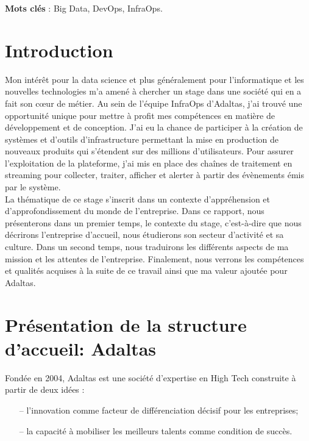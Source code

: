 \documentclass[12pt, french]{report}
\begin{document}
\noindent\textbf{Mots clés} : Big Data, DevOps, InfraOps.

\newpage
\thispagestyle{empty}
\mbox{}
\newpage

\begingroup
\hypersetup{linkcolor=black}
\listoffigures
\tableofcontents
\newpage
\endgroup

\chapter{Introduction}

Mon intérêt pour la data science et plus généralement pour l’informatique et les nouvelles technologies m’a amené à chercher un stage dans une société qui en a fait son cœur de métier. Au sein de l'équipe InfraOps d'Adaltas, j'ai trouvé une opportunité unique pour mettre à profit mes compétences en matière de développement et de conception. J'ai eu la chance de participer à la création de systèmes et d'outils d'infrastructure permettant la mise en production de nouveaux produits qui s'étendent sur des millions d'utilisateurs. Pour assurer l’exploitation de la plateforme, j'ai mis en place des chaînes de traitement en streaming pour collecter, traiter, afficher et alerter à partir des évènements émis par le système.\\

La thématique de ce stage s’inscrit dans un contexte d’appréhension et d'approfondissement du monde de l’entreprise. Dans ce rapport, nous présenterons dans un premier temps, le contexte du stage, c’est-à-dire que nous décrirons l’entreprise d’accueil, nous étudierons son secteur d’activité et sa culture. Dans un second temps, nous traduirons les différents aspects de ma mission et les attentes de l'entreprise. Finalement, nous verrons les compétences et qualités acquises à la suite de ce travail ainsi que ma valeur ajoutée pour Adaltas.

\chapter{Présentation de la structure d'accueil: Adaltas}

Fondée en 2004, Adaltas est une société d’expertise en High Tech construite à partir de deux idées :
\begin{itemize}
  \item[--] l’innovation comme facteur de différenciation décisif pour les entreprises;
  \item[--] la capacité à mobiliser les meilleurs talents comme condition de succès.\\
\end{itemize}
\end{document}
